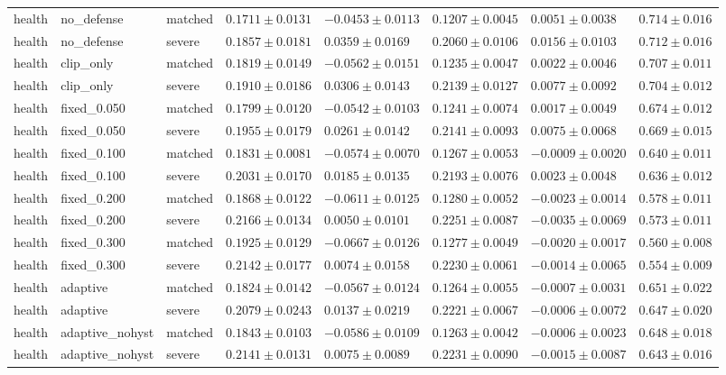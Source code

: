 \begin{table}[!t]
{\begin{tabular}{llllllll}
health & no\_defense & matched & $0.1711\pm0.0131$ & $-0.0453\pm0.0113$ & $0.1207\pm0.0045$ & $0.0051\pm0.0038$ & $0.714\pm0.016$ \\
health & no\_defense & severe & $0.1857\pm0.0181$ & $0.0359\pm0.0169$ & $0.2060\pm0.0106$ & $0.0156\pm0.0103$ & $0.712\pm0.016$ \\
health & clip\_only & matched & $0.1819\pm0.0149$ & $-0.0562\pm0.0151$ & $0.1235\pm0.0047$ & $0.0022\pm0.0046$ & $0.707\pm0.011$ \\
health & clip\_only & severe & $0.1910\pm0.0186$ & $0.0306\pm0.0143$ & $0.2139\pm0.0127$ & $0.0077\pm0.0092$ & $0.704\pm0.012$ \\
health & fixed\_0.050 & matched & $0.1799\pm0.0120$ & $-0.0542\pm0.0103$ & $0.1241\pm0.0074$ & $0.0017\pm0.0049$ & $0.674\pm0.012$ \\
health & fixed\_0.050 & severe & $0.1955\pm0.0179$ & $0.0261\pm0.0142$ & $0.2141\pm0.0093$ & $0.0075\pm0.0068$ & $0.669\pm0.015$ \\
health & fixed\_0.100 & matched & $0.1831\pm0.0081$ & $-0.0574\pm0.0070$ & $0.1267\pm0.0053$ & $-0.0009\pm0.0020$ & $0.640\pm0.011$ \\
health & fixed\_0.100 & severe & $0.2031\pm0.0170$ & $0.0185\pm0.0135$ & $0.2193\pm0.0076$ & $0.0023\pm0.0048$ & $0.636\pm0.012$ \\
health & fixed\_0.200 & matched & $0.1868\pm0.0122$ & $-0.0611\pm0.0125$ & $0.1280\pm0.0052$ & $-0.0023\pm0.0014$ & $0.578\pm0.011$ \\
health & fixed\_0.200 & severe & $0.2166\pm0.0134$ & $0.0050\pm0.0101$ & $0.2251\pm0.0087$ & $-0.0035\pm0.0069$ & $0.573\pm0.011$ \\
health & fixed\_0.300 & matched & $0.1925\pm0.0129$ & $-0.0667\pm0.0126$ & $0.1277\pm0.0049$ & $-0.0020\pm0.0017$ & $0.560\pm0.008$ \\
health & fixed\_0.300 & severe & $0.2142\pm0.0177$ & $0.0074\pm0.0158$ & $0.2230\pm0.0061$ & $-0.0014\pm0.0065$ & $0.554\pm0.009$ \\
health & adaptive & matched & $0.1824\pm0.0142$ & $-0.0567\pm0.0124$ & $0.1264\pm0.0055$ & $-0.0007\pm0.0031$ & $0.651\pm0.022$ \\
health & adaptive & severe & $0.2079\pm0.0243$ & $0.0137\pm0.0219$ & $0.2221\pm0.0067$ & $-0.0006\pm0.0072$ & $0.647\pm0.020$ \\
health & adaptive\_nohyst & matched & $0.1843\pm0.0103$ & $-0.0586\pm0.0109$ & $0.1263\pm0.0042$ & $-0.0006\pm0.0023$ & $0.648\pm0.018$ \\
health & adaptive\_nohyst & severe & $0.2141\pm0.0131$ & $0.0075\pm0.0089$ & $0.2231\pm0.0090$ & $-0.0015\pm0.0087$ & $0.643\pm0.016$ \\

\end{tabular}}
\end{table}
